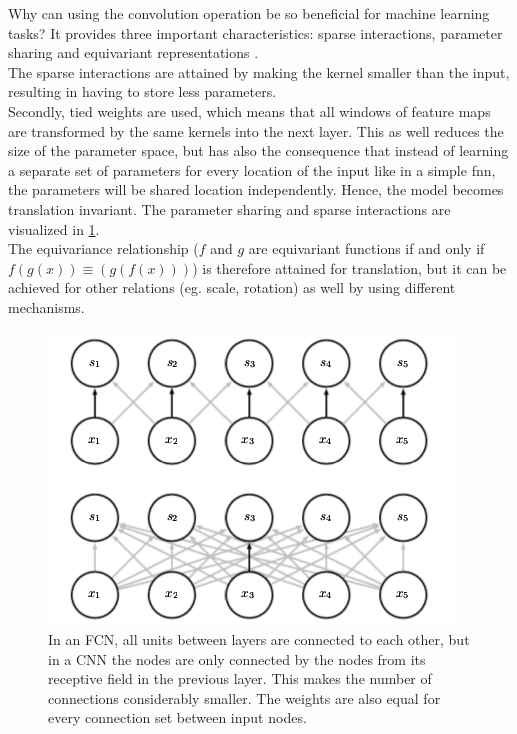 Why can using the convolution operation be so beneficial for machine learning tasks? It provides three important characteristics: sparse interactions, parameter sharing and equivariant representations \cite{goodf16}.\\
The sparse interactions are attained by making the kernel smaller than the input, resulting in having to store less parameters. \\
Secondly, tied weights are used, which means that all windows of feature maps are transformed by the same kernels into the next layer. This as well reduces the size of the parameter space, but has also the consequence that instead of learning a separate set of parameters for every location of the input like in a simple \gls{fnn}, the parameters will be shared location independently. Hence, the model becomes translation invariant. The parameter sharing and sparse interactions are visualized in \ref{fig:ps}.\\
The equivariance relationship ($f$ and $g$ are equivariant functions if and only if $f(g(x))\equiv(g(f(x)))$) is therefore attained for translation, but it can be achieved for other relations (eg. scale, rotation) as well by using different mechanisms.
\begin{figure}
\centering
\includegraphics[scale=0.7]{fig/param_sharing}
\caption[Connections \gls{fnn} and \gls{cnn}]{In an FCN, all units between layers are connected to each other, but in a CNN the nodes are only connected by the nodes from its receptive field in the previous layer. This makes the number of connections considerably smaller. The weights are also equal for every connection set between input nodes.}
\label{fig:ps}
\end{figure}


